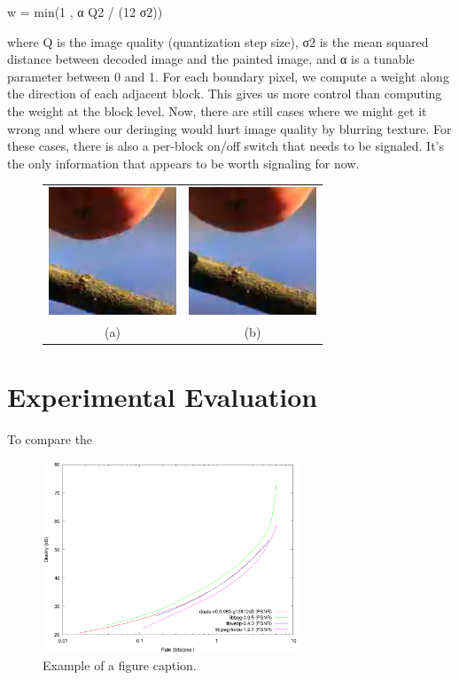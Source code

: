 \documentclass[conference, 10pt]{IEEEtran}
\begin{document}
w = min(1 , α Q2 / (12 σ2))

where Q is the image quality (quantization step size), σ2 is the mean squared distance between decoded image and the painted image, and α is a tunable parameter between 0 and 1. For each boundary pixel, we compute a weight along the direction of each adjacent block. This gives us more control than computing the weight at the block level. Now, there are still cases where we might get it wrong and where our deringing would hurt image quality by blurring texture. For these cases, there is also a per-block on/off switch that needs to be signaled. It's the only information that appears to be worth signaling for now.

\begin{figure}
\begin{center}
\begin{tabular}{c c}
  \includegraphics[natwidth=200,natheight=200,width=1.5in]{fruits_nopf.png} &
  \includegraphics[natwidth=200,natheight=200,width=1.5in]{fruits_pf.png} \\
  (a) & (b)
\end{tabular}
\end{center}
\caption[pvq]{\label{fig:dering} }
\end{figure}

\section{Experimental Evaluation}

To compare the 

\begin{figure}[h]
\begin{center}
\noindent
  \includegraphics[width=3in]{pcs2015-psnr}
  \caption{Example of a figure caption.}\label{Fig1Label}
\end{center}
\end{figure}
\end{document}
